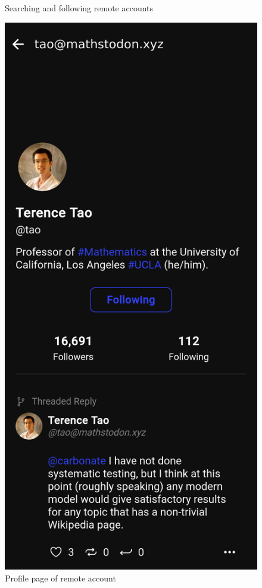 \begin{figure}[htbp]
\begin{minipage}[b]{0.45\linewidth}
    \caption{Searching and following remote accounts}
    \label{fig:search_follow}
  \end{minipage}
  \hfill %
  \begin{minipage}[b]{0.45\linewidth}
    \centering
    \includegraphics[width=\linewidth]{Graphics/remoteaccountprofile.png}
    \caption{Profile page of remote account}
    \label{fig:remote_profile}
  \end{minipage}
\end{figure}


